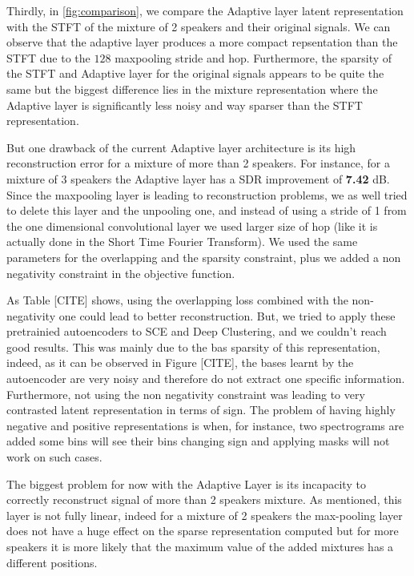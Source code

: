 \documentclass[master, tikz, final,11pt, dvipdfmx]{iscs-thesis}
\begin{document}
Thirdly, in \autoref{fig:comparison}, we compare the Adaptive layer latent representation with the STFT of the mixture of 2 speakers and their original signals. We can observe that the adaptive layer produces a more compact repsentation than the STFT due to the $128$ maxpooling stride and hop. Furthermore, the sparsity of the STFT and Adaptive layer for the original signals appears to be quite the same but the biggest difference lies in the mixture representation where the Adaptive layer is significantly less noisy and way sparser than the STFT representation.

But one drawback of the current Adaptive layer architecture is its high reconstruction error for a mixture of more than 2 speakers. For instance, for a mixture of 3 speakers the Adaptive layer has a SDR improvement of \textbf{7.42} dB. Since the maxpooling layer is leading to reconstruction problems, we as well tried to delete this layer and the unpooling one, and instead of using a stride of 1 from the one dimensional convolutional layer we used larger size of hop (like it is actually done in the Short Time Fourier Transform). We used the same parameters for the overlapping and the sparsity constraint, plus we added a non negativity constraint in the objective function.

As Table [CITE] shows, using the overlapping loss combined with the non-negativity one could lead to better reconstruction. But, we tried to apply these pretrainied autoencoders to SCE and Deep Clustering, and we couldn't reach good results. This was mainly due to the bas sparsity of this representation, indeed, as it can be observed in Figure [CITE], the bases learnt by the autoencoder are very noisy and therefore do not extract one specific information. Furthermore, not using the non negativity constraint was leading to very contrasted latent representation in terms of sign. The problem of having highly negative and positive representations is when, for instance, two spectrograms are added some bins will see their bins changing sign and applying masks will not work on such cases.

The biggest problem for now with the Adaptive Layer is its incapacity to correctly reconstruct signal of more than 2 speakers mixture. As mentioned, this layer is not fully linear, indeed for a mixture of 2 speakers the max-pooling layer does not have a huge effect on the sparse representation computed but for more speakers it is more likely that the maximum value of the added mixtures has a different positions.
\end{document}
